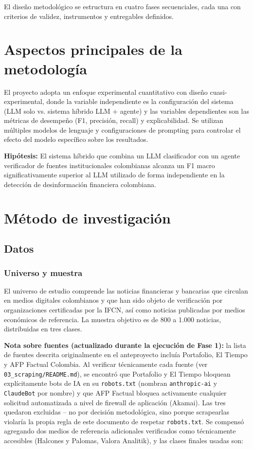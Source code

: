El diseño metodológico se estructura en cuatro fases secuenciales, cada una con criterios de validez, instrumentos y entregables definidos.

\section{Aspectos principales de la metodología}

El proyecto adopta un enfoque experimental cuantitativo con diseño cuasi-experimental, donde la variable independiente es la configuración del sistema (LLM solo vs. sistema híbrido LLM + agente) y las variables dependientes son las métricas de desempeño (F1, precisión, recall) y explicabilidad. Se utilizan múltiples modelos de lenguaje y configuraciones de prompting para controlar el efecto del modelo específico sobre los resultados.

\textbf{Hipótesis:} El sistema híbrido que combina un LLM clasificador con un agente verificador de fuentes institucionales colombianas alcanza un F1 macro significativamente superior al LLM utilizado de forma independiente en la detección de desinformación financiera colombiana.

\section{Método de investigación}

\subsection{Datos}

\subsubsection{Universo y muestra}

El universo de estudio comprende las noticias financieras y bancarias que circulan en medios digitales colombianos y que han sido objeto de verificación por organizaciones certificadas por la IFCN, así como noticias publicadas por medios económicos de referencia. La muestra objetivo es de 800 a 1.000 noticias, distribuidas en tres clases.

\textbf{Nota sobre fuentes (actualizado durante la ejecución de Fase 1):} la lista de fuentes descrita originalmente en el anteproyecto incluía Portafolio, El Tiempo y AFP Factual Colombia. Al verificar técnicamente cada fuente (ver \texttt{03\_scraping/README.md}), se encontró que Portafolio y El Tiempo bloquean explícitamente bots de IA en su \texttt{robots.txt} (nombran \texttt{anthropic-ai} y \texttt{ClaudeBot} por nombre) y que AFP Factual bloquea activamente cualquier solicitud automatizada a nivel de firewall de aplicación (Akamai). Las tres quedaron excluidas -- no por decisión metodológica, sino porque scrapearlas violaría la propia regla de este documento de respetar \texttt{robots.txt}. Se compensó agregando dos medios de referencia adicionales verificados como técnicamente accesibles (Halcones y Palomas, Valora Analitik), y las clases finales usadas son:

